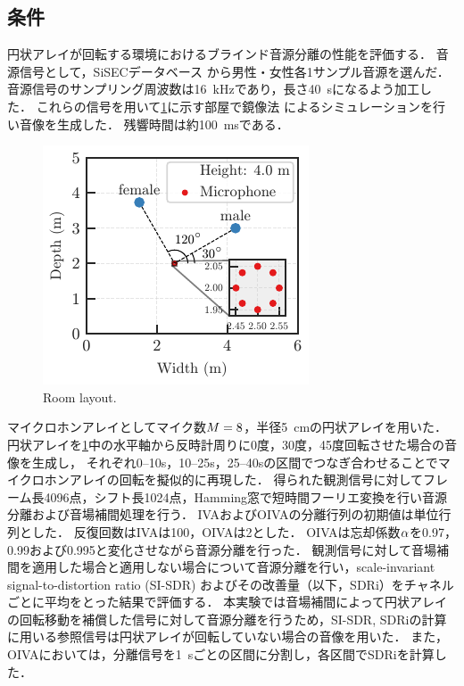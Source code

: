 \documentclass{article}
\begin{document}
\subsection{条件}
円状アレイが回転する環境におけるブラインド音源分離の性能を評価する．
音源信号として，SiSECデータベース \cite{Araki:2012:LVAICA}から男性・女性各1サンプル音源を選んだ．
音源信号のサンプリング周波数は\SI{16}{\kilo\hertz}であり，長さ\SI{40}{\second}になるよう加工した．
これらの信号を用いて\cref{fig:room}に示す部屋で鏡像法 \cite{Allen:1979:JASA} によるシミュレーションを行い音像を生成した．
残響時間は約\SI{100}{\milli\second}である．
\begin{figure}[t]
  \centering
  \includegraphics{figures/room_layout.pdf}
  \caption{Room layout.}
  \label{fig:room}
\end{figure}
マイクロホンアレイとしてマイク数$M = 8$，半径\SI{5}{\cm}の円状アレイを用いた．
円状アレイを\cref{fig:room}中の水平軸から反時計周りに0度，30度，45度回転させた場合の音像を生成し，
それぞれ0--10\si{\second}，10--25\si{\second}，25--40\si{\second}の区間でつなぎ合わせることでマイクロホンアレイの回転を擬似的に再現した．
得られた観測信号に対してフレーム長4096点，シフト長1024点，Hamming窓で短時間フーリエ変換を行い音源分離および音場補間処理を行う．
IVAおよびOIVAの分離行列の初期値は単位行列とした．
反復回数はIVAは100，OIVAは2とした．
OIVAは忘却係数$\alpha$を\num{0.97}，\num{0.99}および\num{0.995}と変化させながら音源分離を行った．
観測信号に対して音場補間を適用した場合と適用しない場合について音源分離を行い，scale-invariant signal-to-distortion ratio (SI-SDR) \cite{LeRoux:2019:ICASSP} およびその改善量（以下，SDRi）をチャネルごとに平均をとった結果で評価する．
本実験では音場補間によって円状アレイの回転移動を補償した信号に対して音源分離を行うため，SI-SDR, SDRiの計算に用いる参照信号は円状アレイが回転していない場合の音像を用いた．
また，OIVAにおいては，分離信号を\SI{1}{\second}ごとの区間に分割し，各区間でSDRiを計算した．
\end{document}
